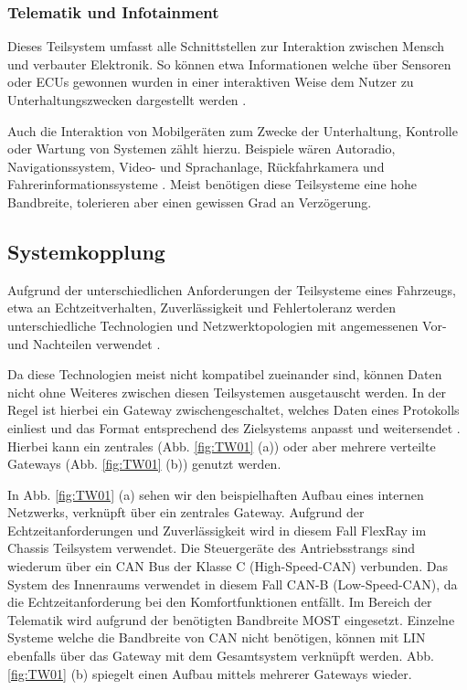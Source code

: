         \subsubsection{Telematik und Infotainment}
        Dieses Teilsystem umfasst alle Schnittstellen zur Interaktion zwischen Mensch und verbauter Elektronik. So können etwa Informationen welche über Sensoren
        oder ECUs gewonnen wurden in einer interaktiven Weise dem Nutzer zu Unterhaltungszwecken dargestellt werden \cite{TW_huang2018vehicle}.
        
        Auch die Interaktion von Mobilgeräten
        zum Zwecke der Unterhaltung, Kontrolle oder Wartung von Systemen zählt hierzu. Beispiele wären Autoradio, Navigationssystem, Video- und Sprachanlage, Rückfahrkamera und Fahrerinformationssysteme \cite{reif2011bosch}.
        Meist benötigen diese Teilsysteme eine hohe Bandbreite, tolerieren aber einen gewissen Grad an Verzögerung.
    \subsection{Systemkopplung}
    Aufgrund der unterschiedlichen Anforderungen der Teilsysteme eines Fahrzeugs, etwa an Echtzeitverhalten, Zuverlässigkeit und Fehlertoleranz werden unterschiedliche Technologien
    und Netzwerktopologien mit angemessenen Vor- und Nachteilen verwendet \cite{leen1999digital}. 
    
    Da diese Technologien meist nicht kompatibel zueinander sind, können Daten nicht ohne Weiteres zwischen diesen
    Teilsystemen ausgetauscht werden. In der Regel ist hierbei ein Gateway zwischengeschaltet, welches Daten eines Protokolls einliest und das Format entsprechend des Zielsystems anpasst
    und weitersendet \cite{reif2011bosch}\cite{TW_kim2014gateway}. Hierbei kann ein zentrales (Abb. \ref{fig:TW01} (a)) oder aber mehrere verteilte Gateways (Abb. \ref{fig:TW01} (b)) genutzt werden. 

    In Abb. \ref{fig:TW01} (a) sehen wir den beispielhaften Aufbau eines internen Netzwerks, verknüpft über ein zentrales Gateway. Aufgrund der Echtzeitanforderungen und Zuverlässigkeit wird in diesem Fall FlexRay
    im Chassis Teilsystem verwendet. Die Steuergeräte des Antriebsstrangs sind wiederum über ein CAN Bus der Klasse C (High-Speed-CAN) verbunden. Das System des Innenraums verwendet in diesem Fall 
    CAN-B (Low-Speed-CAN), da die Echtzeitanforderung bei den Komfortfunktionen entfällt. Im Bereich der Telematik wird aufgrund der benötigten Bandbreite MOST eingesetzt. Einzelne Systeme welche die
    Bandbreite von CAN nicht benötigen, können mit LIN ebenfalls über das Gateway mit dem Gesamtsystem verknüpft werden.
    Abb. \ref{fig:TW01} (b) spiegelt einen Aufbau mittels mehrerer Gateways wieder.

